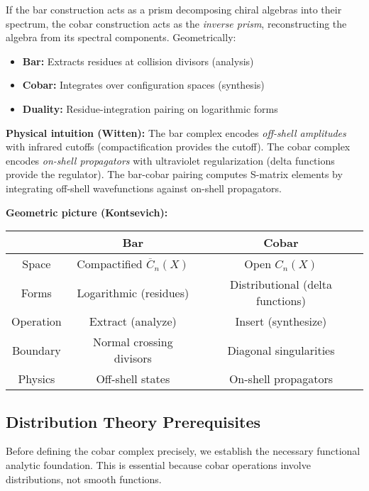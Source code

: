 \begin{remark}
If the bar construction acts as a prism decomposing chiral algebras into their spectrum, the cobar construction acts as the \emph{inverse prism}, reconstructing the algebra from its spectral components. Geometrically:
\begin{itemize}
\item \textbf{Bar:} Extracts residues at collision divisors (analysis)
\item \textbf{Cobar:} Integrates over configuration spaces (synthesis)
\item \textbf{Duality:} Residue-integration pairing on logarithmic forms
\end{itemize}

\textbf{Physical intuition (Witten):} The bar complex encodes \emph{off-shell amplitudes} 
with infrared cutoffs (compactification provides the cutoff). The cobar complex encodes 
\emph{on-shell propagators} with ultraviolet regularization (delta functions provide 
the regulator). The bar-cobar pairing computes S-matrix elements by integrating 
off-shell wavefunctions against on-shell propagators.

\textbf{Geometric picture (Kontsevich):} 
\begin{center}
\begin{tabular}{c|c|c}
& \textbf{Bar} & \textbf{Cobar} \\ \hline
Space & Compactified $\overline{C}_n(X)$ & Open $C_n(X)$ \\
Forms & Logarithmic (residues) & Distributional (delta functions) \\
Operation & Extract (analyze) & Insert (synthesize) \\
Boundary & Normal crossing divisors & Diagonal singularities \\
Physics & Off-shell states & On-shell propagators \\
\end{tabular}
\end{center}
\end{remark}

\subsection{Distribution Theory Prerequisites}

Before defining the cobar complex precisely, we establish the necessary functional 
analytic foundation. This is essential because cobar operations involve distributions, 
not smooth functions.

